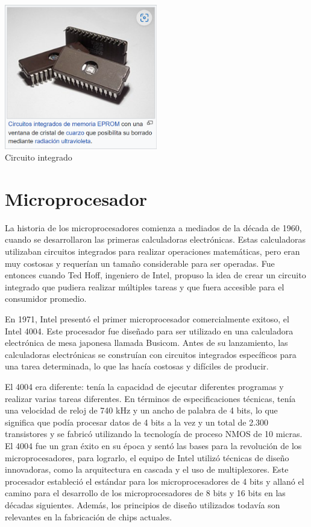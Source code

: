 \documentclass{article}
\begin{document}
\begin{center}
    \includegraphics[width=0.5\textwidth]{res/circuito_integrado.png}\\
    Circuito integrado
\end{center}


\section*{Microprocesador}
La historia de los microprocesadores comienza a mediados de la década de 1960, cuando se desarrollaron las primeras 
calculadoras electrónicas. Estas calculadoras utilizaban circuitos integrados para realizar operaciones matemáticas, 
pero eran muy costosas y requerían un tamaño considerable para ser operadas. Fue entonces cuando Ted Hoff, 
ingeniero de Intel, propuso la idea de crear un circuito integrado que pudiera realizar múltiples tareas y que fuera accesible 
para el consumidor promedio.

En 1971, Intel presentó el primer microprocesador comercialmente exitoso, el Intel 4004. Este procesador fue diseñado 
para ser utilizado en una calculadora electrónica de mesa japonesa llamada Busicom. Antes de su lanzamiento, 
las calculadoras electrónicas se construían con circuitos integrados específicos para una tarea determinada, 
lo que las hacía costosas y difíciles de producir.

El 4004 era diferente: tenía la capacidad de ejecutar diferentes programas y realizar varias tareas diferentes. 
En términos de especificaciones técnicas, tenía una velocidad de reloj de 740 kHz y un ancho de palabra de 4 bits, 
lo que significa que podía procesar datos de 4 bits a la vez y un total de 2.300 transistores y se fabricó utilizando 
la tecnología de proceso NMOS de 10 micras. El 4004 fue un gran éxito en su época y sentó las bases para la revolución 
de los microprocesadores, para lograrlo, el equipo de Intel utilizó técnicas de diseño innovadoras, como la arquitectura en cascada 
y el uso de multiplexores. Este procesador estableció el estándar para los microprocesadores de 4 bits y allanó el camino 
para el desarrollo  de los microprocesadores de 8 bits y 16 bits en las décadas siguientes. Además, los principios de diseño 
utilizados todavía son relevantes en la fabricación de chips actuales.
\end{document}
